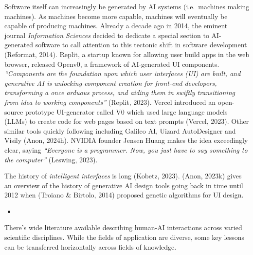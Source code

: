 \documentclass[
  letterpaper,
  DIV=11,
  numbers=noendperiod]{scrartcl}
\providecommand{\tightlist}{%
  \setlength{\itemsep}{0pt}\setlength{\parskip}{0pt}}\usepackage{longtable,booktabs,array}
\begin{document}
Software itself can increasingly be generated by AI systems
(i.e.~machines making machines). As machines become more capable,
machines will eventually be capable of producing machines. Already a
decade ago in 2014, the eminent journal \emph{Information Sciences}
decided to dedicate a special section to AI-generated software to call
attention to this tectonic shift in software development (Reformat,
2014). Replit, a startup known for allowing user build apps in the web
browser, released Openv0, a framework of AI-generated UI components.
\emph{``Components are the foundation upon which user interfaces (UI)
are built, and generative AI is unlocking component creation for
front-end developers, transforming a once arduous process, and aiding
them in swiftly transitioning from idea to working components''}
(Replit, 2023). Vercel introduced an open-source prototype UI-generator
called V0 which used large language models (LLMs) to create code for web
pages based on text prompts (Vercel, 2023). Other similar tools quickly
following including Galileo AI, Uizard AutoDesigner and Visily (Anon,
2024h). NVIDIA founder Jensen Huang makes the idea exceedingly clear,
saying \emph{``Everyone is a programmer. Now, you just have to say
something to the computer''} (Leswing, 2023).

The history of \emph{intelligent interfaces} is long (Kobetz, 2023).
(Anon, 2023k) gives an overview of the history of generative AI design
tools going back in time until 2012 when (Troiano \& Birtolo, 2014)
proposed genetic algorithms for UI design.

\begin{itemize}
\tightlist
\item
\end{itemize}

There's wide literature available describing human-AI interactions
across varied scientific disciplines. While the fields of application
are diverse, some key lessons can be transferred horizontally across
fields of knowledge.
\end{document}

